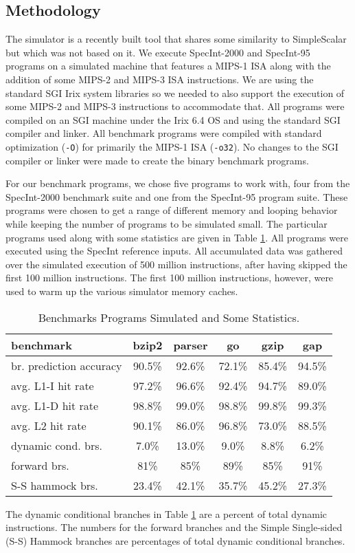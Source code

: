 \documentclass[10pt,dvips]{article}
\begin{document}
\subsection{Methodology}
%
The simulator is a recently built tool that shares some similarity
to SimpleScalar \cite{Austin97} but which was not based on it.
We execute
SpecInt-2000 and SpecInt-95 programs on a simulated machine
that features a MIPS-1 ISA along with the addition of some MIPS-2 and
MIPS-3 ISA instructions.  We are using the standard SGI Irix system
libraries so we needed to also support the execution of some
MIPS-2 and MIPS-3 instructions to accommodate
that.  All programs were compiled on an SGI machine under the
Irix 6.4 OS and using the standard SGI compiler and linker.  
All benchmark programs were compiled with
standard optimization ({\tt -O}) for primarily the MIPS-1 ISA ({\tt -o32}).
No changes to the SGI compiler or linker were made to create
the binary benchmark programs.

For our benchmark programs, we chose five programs to work with,
four from the SpecInt-2000 benchmark suite
and one from the SpecInt-95 program suite.
These programs were chosen to get a range of different memory and looping
behavior while keeping the number of programs to be simulated small.
The particular programs used along with some statistics 
are given in Table \ref{tab:benches}.
All programs were executed using the SpecInt reference inputs.
All accumulated data was gathered over the simulated execution of
500 million instructions,
after having skipped the first 100 million instructions.
The first 100 million instructions, however, were used to warm up the
various simulator memory caches.
%
\begin{table}
\begin{center}
\caption{Benchmarks Programs Simulated and Some Statistics.}
\label{tab:benches}
\begin{tabular}{|l|c|c|c|c|c|}
\hline 
benchmark&bzip2&parser&go&gzip&gap\\
\hline 
\hline 
br. prediction accuracy&90.5\%&92.6\%&72.1\%&85.4\%&94.5\%\\
\hline 
avg. L1-I hit rate&97.2\%&96.6\%&92.4\%&94.7\%&89.0\%\\
\hline 
avg. L1-D hit rate&98.8\%&99.0\%&98.8\%&99.8\%&99.3\%\\
\hline 
avg. L2 hit rate&90.1\%&86.0\%&96.8\%&73.0\%&88.5\%\\
\hline 
dynamic cond. brs.&7.0\%&13.0\%&9.0\%&8.8\%&6.2\%\\
\hline 
forward brs.&81\%&85\%&89\%&85\%&91\%\\
\hline 
S-S hammock brs.&23.4\%&42.1\%&35.7\%&45.2\%&27.3\%\\
\hline
\end{tabular}
\end{center}
\end{table}
%
The dynamic conditional branches in Table \ref{tab:benches} are
a percent of total dynamic instructions.
The numbers for the forward branches and the Simple Single-sided (S-S)
Hammock
branches are percentages of total dynamic conditional branches.
%
\end{document}
